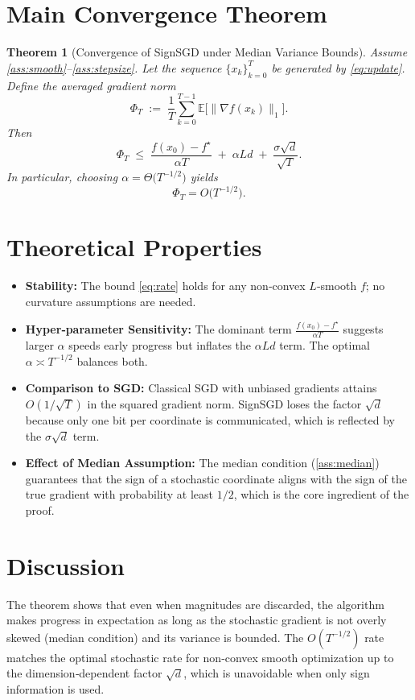 \documentclass[11pt]{article}
\newtheorem{theorem}{Theorem}
\begin{document}
\section*{Main Convergence Theorem}
\begin{theorem}[Convergence of SignSGD under Median Variance Bounds]\label{thm:main}
Assume \ref{ass:smooth}–\ref{ass:stepsize}. Let the sequence $\{x_k\}_{k=0}^{T}$ be generated by \eqref{eq:update}. Define the averaged gradient norm
\[
\Phi_T\;:=\;\frac{1}{T}\sum_{k=0}^{T-1}\mathbb{E}\bigl[\|\nabla f(x_k)\|_1\bigr].
\]
Then
\begin{equation}
\Phi_T\;\le\;\frac{f(x_0)-f^\star}{\alpha T}
      \;+\; \alpha L d\;+\;\frac{\sigma\sqrt{d}}{\sqrt{T}} .
\label{eq:rate}
\end{equation}
In particular, choosing $\alpha = \Theta\!\bigl(T^{-1/2}\bigr)$ yields
\[
\Phi_T = O\!\bigl(T^{-1/2}\bigr) .
\]
\end{theorem}

\section*{Theoretical Properties}
\begin{itemize}
    \item \textbf{Stability:} The bound \eqref{eq:rate} holds for any non‑convex $L$‑smooth $f$; no curvature assumptions are needed.
    \item \textbf{Hyper‑parameter Sensitivity:} The dominant term $ \frac{f(x_0)-f^\star}{\alpha T}$ suggests larger $\alpha$ speeds early progress but inflates the $ \alpha L d$ term. The optimal $\alpha\asymp T^{-1/2}$ balances both.
    \item \textbf{Comparison to SGD:} Classical SGD with unbiased gradients attains $O(1/\sqrt{T})$ in the squared gradient norm. SignSGD loses the factor $\sqrt{d}$ because only one bit per coordinate is communicated, which is reflected by the $\sigma\sqrt{d}$ term.
    \item \textbf{Effect of Median Assumption:} The median condition (\ref{ass:median}) guarantees that the sign of a stochastic coordinate aligns with the sign of the true gradient with probability at least $1/2$, which is the core ingredient of the proof.
\end{itemize}

\section*{Discussion}
The theorem shows that even when magnitudes are discarded, the algorithm makes progress in expectation as long as the stochastic gradient is not overly skewed (median condition) and its variance is bounded. The $O(T^{-1/2})$ rate matches the optimal stochastic rate for non‑convex smooth optimization up to the dimension‑dependent factor $\sqrt{d}$, which is unavoidable when only sign information is used.
\end{document}
